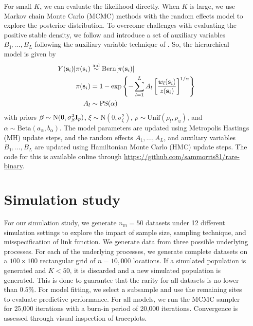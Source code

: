 For small $K$, we can evaluate the likelihood directly.
When $K$ is large, we use Markov chain Monte Carlo (MCMC) methods with the random effects model to explore the posterior distribution.
To overcome challenges with evaluating the positive stable density, we follow \citet{Reich2012} and introduce a set of auxiliary variables $B_1, \ldots, B_L$ following the auxiliary variable technique of \citet{Stephenson2009} \citep[see Appendix A.3]{Reich2012}.
So, the hierarchical model is given by
\begin{align}
Y(\mathbf{s}_i) | \pi(\mathbf{s}_i) &\stackrel{\mathrm{ind}}{\sim} \text{Bern}[\pi(\mathbf{s}_i)] \\
\pi(\mathbf{s}_i) &= 1 - \exp \left\{ -\displaystyle \sum_{ l = 1 }^{L} A_l \left[ \frac{ w_{l}(\mathbf{s}_i) }{ z(\mathbf{s}_i) } \right]^{ 1/\alpha} \right\} \nonumber\\
A_l &\sim \text{PS}(\alpha) \nonumber
\end{align}
with priors $\mbox{\boldmath $\beta$} \sim \text{N}(\mathbf{0}, \sigma^2_\beta \mathbf{I}_p )$, $\xi \sim \text{N}(0, \sigma^2_\xi)$, $\rho \sim \text{Unif}(\rho_l, \rho_u)$, and $\alpha \sim \text{Beta}(a_\alpha, b_\alpha)$.
The model parameters are updated using Metropolis Hastings (MH) update steps, and the random effects $A_1, \ldots, A_L$, and auxiliary variables $B_1, \ldots, B_L$ are updated using Hamiltonian Monte Carlo (HMC) update steps.
The code for this is available online through \url{https://github.com/sammorris81/rare-binary}.

\section{Simulation study}\label{rbs:sim}

For our simulation study, we generate $n_m = 50$ datasets under 12 different simulation settings to explore the impact of sample size, sampling technique, and misspecification of link function.
We generate data from three possible underlying processes.
For each of the underlying processes, we generate complete datasets on a $100 \times 100$ rectangular grid of $n = 10,000$ locations.
If a simulated population is generated and $K < 50$, it is discarded and a new simulated population is generated.
This is done to guarantee that the rarity for all datasets is no lower than $0.5\%$.
For model fitting, we select a subsample and use the remaining sites to evaluate predictive performance.
For all models, we run the MCMC sampler for 25,000 iterations with a burn-in period of 20,000 iterations.
Convergence is assessed through visual inspection of traceplots.

